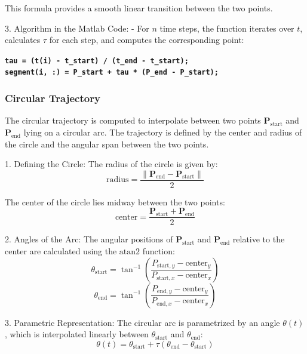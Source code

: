 \documentclass[12pt]{report}
\begin{document}
	This formula provides a smooth linear transition between the two points.
	
	3. Algorithm in the Matlab Code:
	- For \(n\) time steps, the function iterates over \(t\), calculates \(\tau\) for each step, and computes the corresponding point:
	
	\begin{center}
		\textbf{\texttt{tau = (t(i) - t\_start) / (t\_end - t\_start); \\
				segment(i, :) = P\_start + tau * (P\_end - P\_start);}}
	\end{center}
	
	
	\subsubsection{Circular Trajectory}
	
	The circular trajectory is computed to interpolate between two points \( \mathbf{P}_{\text{start}} \) and \( \mathbf{P}_{\text{end}} \) lying on a circular arc. The trajectory is defined by the center and radius of the circle and the angular span between the two points.
	
	1. Defining the Circle:
	The radius of the circle is given by:
\begin{equation}
	\text{radius} = \frac{\|\mathbf{P}_{\text{end}} - \mathbf{P}_{\text{start}}\|}{2}
\end{equation}

	The center of the circle lies midway between the two points:
\begin{equation}
	\text{center} = \frac{\mathbf{P}_{\text{start}} + \mathbf{P}_{\text{end}}}{2}
\end{equation}

	
	2. Angles of the Arc:
	The angular positions of \(\mathbf{P}_{\text{start}}\) and \(\mathbf{P}_{\text{end}}\) relative to the center are calculated using the \(\text{atan2}\) function:
\begin{equation}
	\theta_{\text{start}} = \tan^{-1} \left( \frac{P_{\text{start},y} - \text{center}_y}{P_{\text{start},x} - \text{center}_x} \right)
\end{equation}
\begin{equation}
	\theta_{\text{end}} = \tan^{-1} \left( \frac{P_{\text{end},y} - \text{center}_y}{P_{\text{end},x} - \text{center}_x} \right)
\end{equation}

	3. Parametric Representation:
	The circular arc is parametrized by an angle \(\theta(t)\), which is interpolated linearly between \(\theta_{\text{start}}\) and \(\theta_{\text{end}}\):
\begin{equation}
	\theta(t) = \theta_{\text{start}} + \tau (\theta_{\text{end}} - \theta_{\text{start}})
\end{equation}
\end{document}
